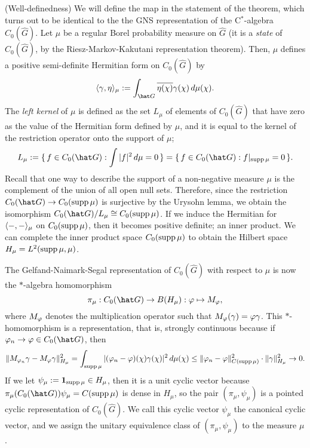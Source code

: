 \documentclass[a4paper]{article}
\begin{document}
\begin{pf}
(Well-definedness)
We will define the map in the statement of the theorem, which turns out to be identical to the the GNS representation of the C$^*$-algebra $C_0(\hat G)$.
Let $\mu$ be a regular Borel probability measure on $\hat G$ (it is a \emph{state} of $C_0(\hat G)$, by the Riesz-Markov-Kakutani representation theorem).
Then, $\mu$ defines a positive semi-definite Hermitian form on $C_0(\hat G)$ by
\[\<\gamma,\eta\>_\mu:=\int_{\hat G}\bar{\eta(\chi)}\gamma(\chi)\,d\mu(\chi).\]
The \emph{left kernel} of $\mu$ is defined as the set $L_\mu$ of elements of $C_0(\hat G)$ that have zero as the value of the Hermitian form defined by $\mu$, and it is equal to the kernel of the restriction operator onto the support of $\mu$;
\[L_\mu:=\{\,f\in C_0(\hat G):\int|f|^2\,d\mu=0\,\}=\{\,f\in C_0(\hat G):f|_{\supp\mu}=0\,\}.\]
Recall that one way to describe the support of a non-negative measure $\mu$ is the complement of the union of all open null sets.
Therefore, since the restriction $C_0(\hat G)\to C_0(\supp\mu)$ is surjective by the Urysohn lemma, we obtain the isomorphism $C_0(\hat G)/L_\mu\cong C_0(\supp\mu)$.
If we induce the Hermitian for $\langle-,-\rangle_\mu$ on $C_0(\operatorname{supp}\mu)$, then it becomes positive definite; an inner product.
We can complete the inner product space $C_0(\operatorname{supp}\mu)$ to obtain the Hilbert space $H_\mu=L^2(\operatorname{supp}\mu,\mu)$.

The Gelfand-Naimark-Segal representation of $C_0(\hat G)$ with respect to $\mu$ is now the $*$-algebra homomorphism
\[\pi_\mu:C_0(\hat G)\to B(H_\mu):\f\mapsto M_\f,\]
where $M_\varphi$ denotes the multiplication operator such that $M_\varphi(\gamma)=\varphi\gamma$.
This $*$-homomorphism is a representation, that is, strongly continuous because if $\f_n\to\f\in C_0(\hat G)$, then
\[\|M_{\varphi_n}\gamma-M_\varphi\gamma\|_{H_\mu}^2=\int_{\operatorname{supp}\mu}|(\varphi_n-\varphi)(\chi)\gamma(\chi)|^2\,d\mu(\chi)\le\|\varphi_n-\varphi\|_{C(\operatorname{supp}\mu)}^2\cdot\|\gamma\|_{H_\mu}^2\to0.\]
If we let $\psi_\mu:=\mathbf{1}_{\operatorname{supp}\mu}\in H_\mu$, then it is a unit cyclic vector because $\pi_\mu(C_0(\hat G))\psi_\mu=C(\supp\mu)$ is dense in $H_\mu$, so the pair $(\pi_\mu,\psi_\mu)$ is a pointed cyclic representation of $C_0(\hat G)$.
We call this cyclic vector $\psi_\mu$ the canonical cyclic vector, and we assign the unitary equivalence class of $(\pi_\mu,\psi_\mu)$ to the measure $\mu$.


\end{pf}
\end{document}
